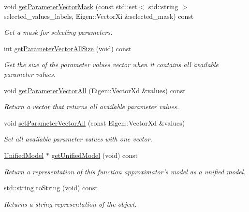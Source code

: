 \begin{DoxyCompactItemize}
void \hyperlink{classDmpBbo_1_1FunctionApproximator_a9dba1f93e426e7511630ec1ece4ace17}{get\+Parameter\+Vector\+Mask} (const std\+::set$<$ std\+::string $>$ selected\+\_\+values\+\_\+labels, Eigen\+::\+Vector\+Xi \&selected\+\_\+mask) const 
\begin{DoxyCompactList}\small\item\em Get a mask for selecting parameters. \end{DoxyCompactList}\item 
int \hyperlink{classDmpBbo_1_1FunctionApproximator_ab24d2485b3b795b516f4844f225100eb}{get\+Parameter\+Vector\+All\+Size} (void) const 
\begin{DoxyCompactList}\small\item\em Get the size of the parameter values vector when it contains all available parameter values. \end{DoxyCompactList}\item 
void \hyperlink{classDmpBbo_1_1FunctionApproximator_ac44b51e5335f973eed54f100618e5496}{get\+Parameter\+Vector\+All} (Eigen\+::\+Vector\+Xd \&values) const 
\begin{DoxyCompactList}\small\item\em Return a vector that returns all available parameter values. \end{DoxyCompactList}\item 
void \hyperlink{classDmpBbo_1_1FunctionApproximator_a9d3c8f22e8237a805af4935a647e5a50}{set\+Parameter\+Vector\+All} (const Eigen\+::\+Vector\+Xd \&values)
\begin{DoxyCompactList}\small\item\em Set all available parameter values with one vector. \end{DoxyCompactList}\item 
\hyperlink{classDmpBbo_1_1UnifiedModel}{Unified\+Model} $\ast$ \hyperlink{classDmpBbo_1_1FunctionApproximator_a7513442a02e6a989f8a79112a482eaf8}{get\+Unified\+Model} (void) const 
\begin{DoxyCompactList}\small\item\em Return a representation of this function approximator's model as a unified model. \end{DoxyCompactList}\item 
std\+::string \hyperlink{classDmpBbo_1_1FunctionApproximator_a1aca816b42cf0d36118be0ab91120d77}{to\+String} (void) const 
\begin{DoxyCompactList}\small\item\em Returns a string representation of the object. \end{DoxyCompactList}\item 

\end{DoxyCompactItemize}
